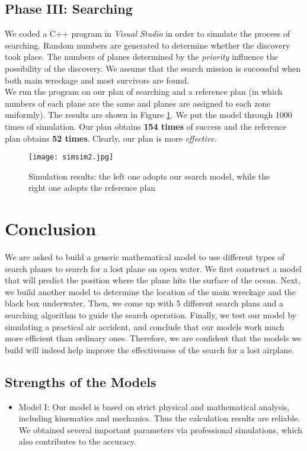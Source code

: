 \documentclass[a4paper,11pt]{article}
\begin{document}
\begin{spacing}{1.0}
\subsection{Phase III: Searching}\label{Phase III}
We coded a C++ program in \textit{Visual Studio} in order to simulate the process of searching. Random numbers are generated to determine whether the discovery took place. The numbers of planes determined by the \textit{priority} influence the possibility of the discovery. We assume that the search mission is successful when both main wreckage and most survivors are found.
\\We run the program on our plan of searching and a reference plan (in which numbers of each plane are the same and planes are assigned to each zone uniformly). The results are shown in Figure \ref{cpp}. We put the model through 1000 times of simulation. Our plan obtains \textbf{154 times} of success and the reference plan obtains \textbf{52 times}. Clearly, our plan is more \textit{effective}.
\begin{figure}[H]
	\centering
	\texttt{[image: simsim2.jpg]}
	\caption{Simulation results: the left one adopts our search model, while the right one adopts the reference plan}\label{cpp}
\end{figure}





\section{Conclusion}\label{Conclusion}
We are asked to build a generic mathematical model to use different types of search planes to search for a lost plane on open water. We first construct a model that will predict the position where the plane hits the surface of the ocean. Next, we build another model to determine the location of the main wreckage and the black box underwater. Then, we come up with 5 different search plans and a searching algorithm to guide the search operation. Finally, we test our model by simulating a practical air accident, and conclude that our models work much more efficient than ordinary ones. Therefore, we are confident that the models we build will indeed help improve the effectiveness of the search for a lost airplane.

\subsection{Strengths of the Models}
\begin{itemize}
	\item Model I: Our model is based on strict physical and mathematical analysis, including  kinematics and mechanics. Thus the calculation results are reliable.  We obtained several important parameters via professional simulations, which also contributes to the accuracy.
	

\end{itemize}
\end{spacing}
\end{document}
